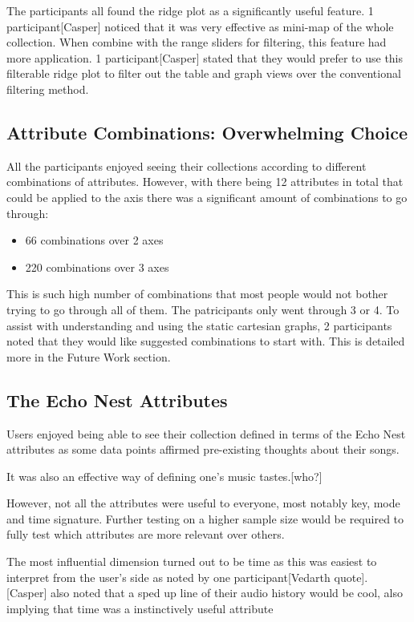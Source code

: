 The participants all found the ridge plot as a significantly useful feature. 1 participant[Casper] noticed that it was very effective as mini-map of the whole collection. When combine with the range sliders for filtering, this feature had more application. 1 participant[Casper] stated that they would prefer to use this filterable ridge plot to filter out the table and graph views over the conventional filtering method.

\subsection{Attribute Combinations: Overwhelming Choice}
All the participants enjoyed seeing their collections according to different combinations of attributes. However, with there being 12 attributes in total that could be applied to the axis there was a significant amount of combinations to go through:\begin{itemize}
    \item 66 combinations over 2 axes
    \item 220 combinations over 3 axes
\end{itemize}
This is such high number of combinations that most people would not bother trying to go through all of them. The patricipants only went through 3 or 4. To assist with understanding and using the static cartesian graphs, 2 participants noted that they would like suggested combinations to start with. This is detailed more in the Future Work section.

\subsection{The Echo Nest Attributes}%
Users enjoyed being able to see their collection defined in terms of the Echo Nest attributes as some data points affirmed pre-existing thoughts about their songs.

It was also an effective way of defining one's music tastes.[who?]

However, not all the attributes were useful to everyone, most notably key, mode and time signature. Further testing on a higher sample size would be required to fully test which attributes are more relevant over others.

The most influential dimension turned out to be time as this was easiest to interpret from the user's side as noted by one participant[Vedarth quote]. [Casper] also noted that a sped up line of their audio history would be cool, also implying that time was a instinctively useful attribute

